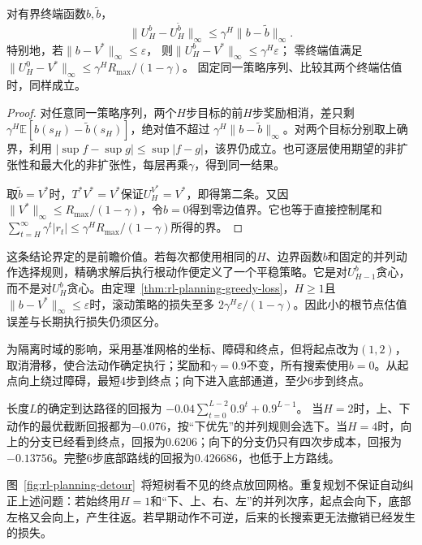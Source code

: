 \begin{theorem}[有限前瞻的终端误差]
 \label{thm:rl-planning-terminal-error}
 对有界终端函数$b,\tilde b$，
 \[
 \lVert U_H^b-U_H^{\tilde b}\rVert_\infty
 \leq\gamma^H\lVert b-\tilde b\rVert_\infty.
 \]
 特别地，若$\lVert b-V^*\rVert_\infty\leq\varepsilon$，
 则$\lVert U_H^b-V^*\rVert_\infty\leq\gamma^H\varepsilon$；
 零终端值满足
 $\lVert U_H^0-V^*\rVert_\infty\leq\gamma^H R_{\max}/(1-\gamma)$。
 固定同一策略序列、比较其两个终端估值时，同样成立。
\end{theorem}
\begin{proof}
 对任意同一策略序列，两个$H$步目标的前$H$步奖励相消，差只剩
 $\gamma^H\mathbb E[b(s_H)-\tilde b(s_H)]$，绝对值不超过
 $\gamma^H\lVert b-\tilde b\rVert_\infty$。对两个目标分别取上确界，利用
 $|\sup f-\sup g|\leq\sup|f-g|$，该界仍成立。也可逐层使用期望的非扩张性和最大化的非扩张性，每层再乘$\gamma$，得到同一结果。

 取$\tilde b=V^*$时，$T^*V^*=V^*$保证$U_H^{V^*}=V^*$，即得第二条。又因$\lVert V^*\rVert_\infty\leq R_{\max}/(1-\gamma)$，令$b=0$得到零边值界。它也等于直接控制尾和
 $\sum_{t=H}^{\infty}\gamma^t|r_t|\leq\gamma^H R_{\max}/(1-\gamma)$所得的界。
\end{proof}

这条结论界定的是前瞻价值。若每次都使用相同的$H$、边界函数$b$和固定的并列动作选择规则，精确求解后执行根动作便定义了一个平稳策略。它是对$U_{H-1}^b$贪心，而不是对$U_H^b$贪心。由定理~\ref{thm:rl-planning-greedy-loss}，$H\geq1$且$\lVert b-V^*\rVert_\infty\leq\varepsilon$时，滚动策略的损失至多
$2\gamma^H\varepsilon/(1-\gamma)$。因此小的根节点估值误差与长期执行损失仍须区分。

\begin{example}[同一障碍下的短前瞻]
 \label{ex:rl-planning-detour}
 为隔离时域的影响，采用基准网格的坐标、障碍和终点，但将起点改为$(1,2)$，取消滑移，使合法动作确定执行；奖励和$\gamma=0.9$不变，所有搜索使用$b=0$。从起点向上绕过障碍，最短4步到终点；向下进入底部通道，至少6步到终点。

 长度$L$的确定到达路径的回报为
 $-0.04\sum_{t=0}^{L-2}0.9^t+0.9^{L-1}$。
 当$H=2$时，上、下动作的最优截断回报都为$-0.076$，按“下优先”的并列规则会选下。当$H=4$时，向上的分支已经看到终点，回报为$0.6206$；向下的分支仍只有四次步成本，回报为$-0.13756$。完整6步底部路线的回报为$0.426686$，也低于上方路线。
\end{example}

图~\ref{fig:rl-planning-detour}~将短树看不见的终点放回网格。重复规划不保证自动纠正上述问题：若始终用$H=1$和“下、上、右、左”的并列次序，起点会向下，底部左格又会向上，产生往返。若早期动作不可逆，后来的长搜索更无法撤销已经发生的损失。

